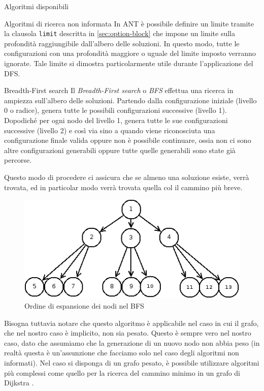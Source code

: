 \begin{chapter}{Algoritmi disponibili}
\begin{section}{Algoritmi di ricerca non informata}
In ANT \`e possibile definire un limite tramite la clausola \verb,limit, descritta in
\ref{sec:option-block} che impone un limite sulla profondit\`a raggiungibile dall'albero
delle soluzioni. In questo modo, tutte le configurazioni con una profondit\`a maggiore o
uguale del limite imposto verranno ignorate. Tale limite si dimostra particolarmente
utile durante l'applicazione del DFS.

	\begin{subsection}{Breadth-First search}
    Il \textit{Breadth-First search} o \textit{BFS} effettua una ricerca in ampiezza
    sull'albero delle soluzioni. Partendo dalla configurazione iniziale (livello 0 o radice),
    genera tutte le possibili configurazioni successive (livello 1). Dopodich\'e
    per ogni nodo del livello 1, genera tutte le sue configurazioni successive (livello
    2) e cos\`i via sino a quando viene riconosciuta una configurazione finale
    valida oppure non \`e possibile continuare, ossia non ci sono altre configurazioni
    generabili oppure tutte quelle generabili sono state gi\`a percorse.

    Questo modo di procedere ci assicura che se almeno una soluzione esiste, verr\`a
    trovata, ed in particolar modo verr\`a trovata quella col il cammino pi\`u breve.

    \begin{figure}[!htb]
        \centering
        \includegraphics[scale=0.5]{img/bfs.png}
        \caption{Ordine di espansione dei nodi nel BFS}
        \label{fig:bfs-tree}
    \end{figure}

    Bisogna tuttavia notare che questo algoritmo \`e applicabile nel caso in cui il
    grafo, che nel nostro caso \`e implicito, non sia pesato. Questo \`e sempre vero
    nel nostro caso, dato che assumiamo che la generazione di un nuovo nodo non abbia
    peso (in realt\`a questa \`e un'assunzione che facciamo solo nel caso degli algoritmi
    non informati). Nel caso si disponga di un grafo pesato, \`e possibile utilizzare
    algoritmi pi\`u complessi come quello per la ricerca del cammino minimo in un grafo
    di Dijkstra \cite{Skiena08}.


\end{subsection}
\end{section}
\end{chapter}
